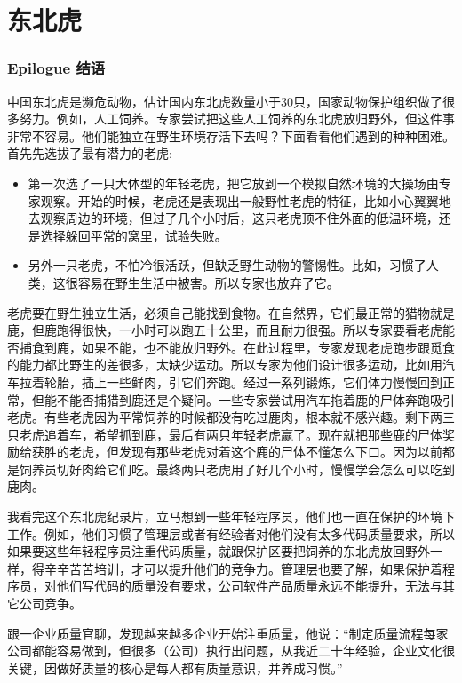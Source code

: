 \chapter{东北虎} %

\hypertarget{epilogue-ux7ed3ux8bed}{%
\subsection{Epilogue 结语}\label{epilogue-ux7ed3ux8bed}}

中国东北虎是濒危动物，估计国内东北虎数量小于30只，国家动物保护组织做了很多努力。例如，人工饲养。专家尝试把这些人工饲养的东北虎放归野外，但这件事非常不容易。他们能独立在野生环境存活下去吗？下面看看他们遇到的种种困难。\\
首先先选拔了最有潜力的老虎:

\begin{itemize}
\tightlist
\item
  第一次选了一只大体型的年轻老虎，把它放到一个模拟自然环境的大操场由专家观察。开始的时候，老虎还是表现出一般野性老虎的特征，比如小心翼翼地去观察周边的环境，但过了几个小时后，这只老虎顶不住外面的低温环境，还是选择躲回平常的窝里，试验失败。
\item
  另外一只老虎，不怕冷很活跃，但缺乏野生动物的警惕性。比如，习惯了人类，这很容易在野生生活中被害。所以专家也放弃了它。
\end{itemize}

老虎要在野生独立生活，必须自己能找到食物。在自然界，它们最正常的猎物就是鹿，但鹿跑得很快，一小时可以跑五十公里，而且耐力很强。所以专家要看老虎能否捕食到鹿，如果不能，也不能放归野外。在此过程里，专家发现老虎跑步跟觅食的能力都比野生的差很多，太缺少运动。所以专家为他们设计很多运动，比如用汽车拉着轮胎，插上一些鲜肉，引它们奔跑。经过一系列锻炼，它们体力慢慢回到正常，但能不能否捕猎到鹿还是个疑问。一些专家尝试用汽车拖着鹿的尸体奔跑吸引老虎。有些老虎因为平常饲养的时候都没有吃过鹿肉，根本就不感兴趣。剩下两三只老虎追着车，希望抓到鹿，最后有两只年轻老虎赢了。现在就把那些鹿的尸体奖励给获胜的老虎，但发现有那些老虎对着这个鹿的尸体不懂怎么下口。因为以前都是饲养员切好肉给它们吃。最终两只老虎用了好几个小时，慢慢学会怎么可以吃到鹿肉。

我看完这个东北虎纪录片，立马想到一些年轻程序员，他们也一直在保护的环境下工作。例如，他们习惯了管理层或者有经验者对他们没有太多代码质量要求，所以如果要这些年轻程序员注重代码质量，就跟保护区要把饲养的东北虎放回野外一样，得辛辛苦苦培训，才可以提升他们的竞争力。管理层也要了解，如果保护着程序员，对他们写代码的质量没有要求，公司软件产品质量永远不能提升，无法与其它公司竞争。

跟一企业质量官聊，发现越来越多企业开始注重质量，他说：``制定质量流程每家公司都能容易做到，但很多（公司）执行出问题，从我近二十年经验，企业文化很关键，因做好质量的核心是每人都有质量意识，并养成习惯。''




